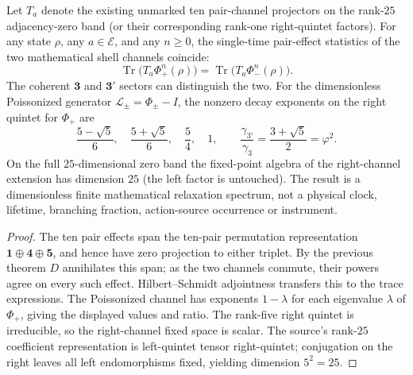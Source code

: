 \documentclass[11pt]{article}
\begin{document}
\begin{corollary}
\label{p1b:cor:two-shell-pair-blindness}
Let $T_a$ denote the existing unmarked ten pair-channel projectors on
the rank-$25$ adjacency-zero band (or their corresponding rank-one
right-quintet factors).  For any state $\rho$, any $a\in\mathscr E$,
and any $n\ge0$, the single-time pair-effect statistics of the two
mathematical shell channels coincide:
\[
 \boxed{\operatorname{Tr}\bigl(T_a\Phi_+^n(\rho)\bigr)=
        \operatorname{Tr}\bigl(T_a\Phi_-^n(\rho)\bigr).}
\]
The coherent $\mathbf3$ and $\mathbf3'$ sectors can distinguish the two.
For the dimensionless Poissonized generator $\mathcal L_\pm=\Phi_\pm-I$,
the nonzero decay exponents on the right quintet for $\Phi_+$ are
\[
 \boxed{\frac{5-\sqrt5}{6},\quad\frac{5+\sqrt5}{6},
          \quad\frac54,\quad1},
 \qquad\frac{\gamma_{3'}}{\gamma_3}=
                 \frac{3+\sqrt5}{2}=\varphi^2.
\]
On the full $25$-dimensional zero band the fixed-point algebra of the
right-channel extension has dimension $25$ (the left factor is untouched).
The result is a dimensionless finite mathematical relaxation spectrum,
not a physical clock, lifetime, branching fraction, action-source
occurrence or instrument.
\end{corollary}
\begin{proof}
The ten pair effects span the ten-pair permutation representation
$\mathbf1\oplus\mathbf4\oplus\mathbf5$, and hence have zero projection
to either triplet.  By the previous theorem $D$ annihilates this span;
as the two channels commute, their powers agree on every such effect.
Hilbert--Schmidt adjointness transfers this to the trace expressions.
The Poissonized channel has exponents $1-\lambda$ for each eigenvalue
$\lambda$ of $\Phi_+$, giving the displayed values and ratio.  The
rank-five right quintet is irreducible, so the right-channel fixed
space is scalar.  The source's rank-$25$ coefficient representation
is left-quintet tensor right-quintet; conjugation on the right leaves
all left endomorphisms fixed, yielding dimension $5^2=25$.
\end{proof}
\end{document}
